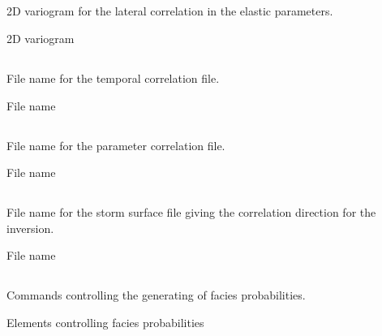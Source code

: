 \subsection{}
 \slist
   \item \Description 2D variogram for the lateral correlation in the elastic parameters.
   \item \Argument 2D variogram
   \item \Default
 \elist

\subsection{}
 \slist
   \item \Description File name for the temporal correlation file.
   \item \Argument File name
   \item \Default
 \elist

\subsection{}
 \slist
   \item \Description File name for the parameter correlation file.
   \item \Argument File name
   \item \Default
 \elist

\subsection{}
 \slist
   \item \Description File name for the storm surface file giving the correlation direction for the inversion.
   \item \Argument File name
   \item \Default
 \elist

\subsection{}
 \slist
   \item \Description Commands controlling the generating of facies probabilities.
   \item \Argument Elements controlling facies probabilities
   \item \Default
 \elist

